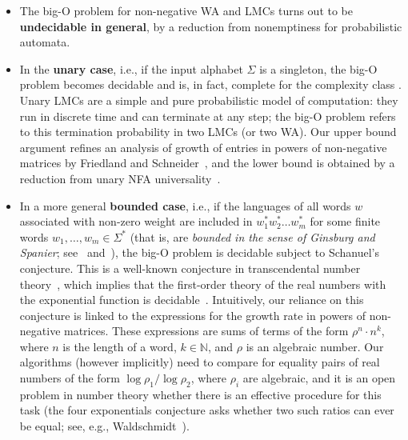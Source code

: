 \documentclass[10pt,a4paper]{amsart}
\numberwithin{equation}{section}
\theoremstyle{plain}
\theoremstyle{definition}
\theoremstyle{remark}
\begin{document}
\begin{itemize}
\item
The big-O problem for non-negative WA and LMCs turns out to be \textbf{undecidable
in general}, by a reduction from nonemptiness for probabilistic automata.
\item
In the \textbf{unary case}, i.e.,
if the input alphabet $\Sigma$ is a singleton, the big-O problem
becomes decidable and is, in fact, complete for the complexity class \coNP.
Unary LMCs are a simple and pure probabilistic model of computation:
they run in discrete time and can terminate at any step; the big-O problem
refers to this termination probability in two LMCs (or two WA).
Our upper bound argument refines an analysis of growth of entries in
powers of non-negative matrices by Friedland and Schneider~\cite{schneider1986influence},
and
the lower bound is obtained by a reduction from unary NFA universality~\cite{stockmeyer1973word}.\item
In a more general \textbf{bounded case}, i.e.,
if the languages of all words $w$ associated with non-zero weight are included in
$w_1^* w_2^* \ldots w_m^*$ for some finite words $w_1, \ldots, w_m \in \Sigma^*$
(that is, are \emph{bounded in the sense of Ginsburg and Spanier};
 see~\cite[Chapter~5]{GinsburgMTCFL} and~\cite{ginsburg1964bounded}),
the big-O problem is decidable subject to Schanuel's conjecture.
This is a well-known conjecture in transcendental number theory~\cite{lang1966introduction}, which
implies that the first-order theory of the real numbers with the exponential
function is decidable~\cite{macintyre1996decidability}.
Intuitively,
our reliance on this conjecture is linked to
the expressions for the growth rate in powers of non-negative matrices.
These expressions are sums of terms of the form
$\rho^n \cdot n^k$, where $n$ is the length of a word, $k \in \mathbb N$,
and $\rho$ is an algebraic number.
Our algorithms (however implicitly) need to compare for equality
pairs of real numbers of the form
$\log \rho_1 / \log \rho_2$, where $\rho_i$ are algebraic,
and it is an open problem in number theory
whether there is an effective procedure for this task
(the four exponentials conjecture asks whether two such ratios
 can ever be equal; see, e.g., Waldschmidt~\cite[Sections~1.3 and~1.4]{Waldschmidt00}).


\end{itemize}
\end{document}
